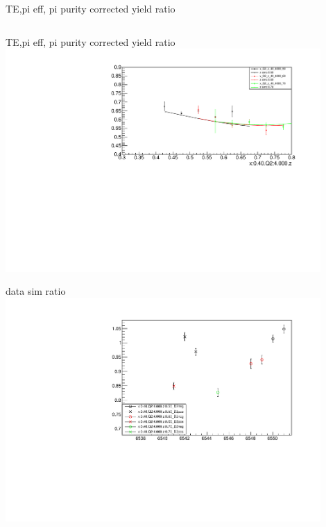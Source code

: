 \begin{frame}{TE,pi eff, pi purity corrected yield ratio}
\begin{columns}
\begin{column}[T]{0.5\textwidth}
\end{column}
\begin{column}[T]{0.5\textwidth}
\end{column}
\end{columns}
\end{frame}
\begin{frame}{TE,pi eff, pi purity corrected yield ratio}
\includegraphics[width = 0.9\textwidth]{results/yield/statistics_corr/x_Q2_40_4000_ratio.pdf}
\end{frame}
\begin{frame}{data sim ratio}
    \includegraphics[width = 0.9\textwidth]{results/yield/run_info_pdf/x_Q2_40_4000_data_simc_ratio.pdf}
\end{frame}
